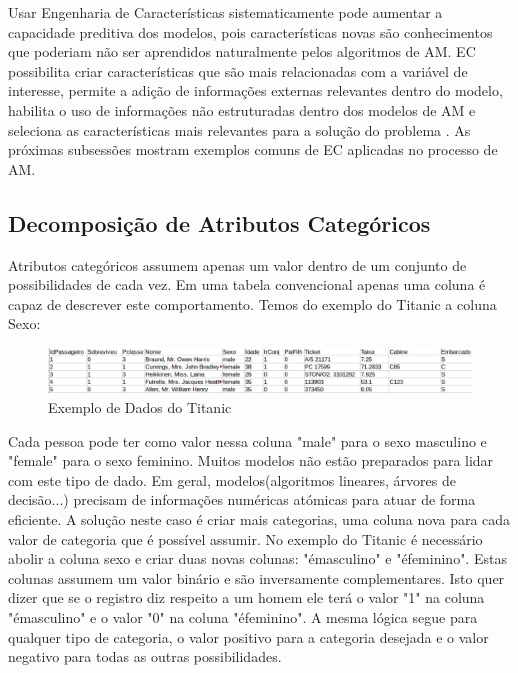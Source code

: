 Usar Engenharia de Características sistematicamente pode aumentar a capacidade preditiva dos modelos, pois características novas são conhecimentos que poderiam não ser aprendidos naturalmente pelos algoritmos de AM. EC possibilita criar características que são mais relacionadas com a variável de interesse, permite a adição de informações externas relevantes dentro do modelo, habilita o uso de informações não estruturadas dentro dos modelos de AM e seleciona as características mais relevantes para a solução do problema \cite{real2013}. As próximas subsessões mostram exemplos comuns de EC aplicadas no processo de AM.

\subsection{Decomposição de Atributos Categóricos}
Atributos categóricos assumem apenas um valor dentro de um conjunto de possibilidades de cada vez. Em uma tabela convencional apenas uma coluna é capaz de descrever este comportamento. Temos do exemplo do Titanic a coluna Sexo: 

\begin{figure}[!h]
\centering
\includegraphics[keepaspectratio=true,scale=0.40]
{figuras/dataEg.eps}
\caption{Exemplo de Dados do Titanic}
\label{data_titatic}
\end{figure}

Cada pessoa pode ter como valor nessa coluna "male" para o sexo masculino e "female" para o sexo feminino. Muitos modelos não estão preparados para lidar com este tipo de dado. Em geral, modelos(algoritmos lineares, árvores de decisão...) precisam de informações numéricas atómicas para atuar de forma eficiente. A solução neste caso é criar mais categorias, uma coluna nova para cada valor de categoria que é possível assumir. No exemplo do Titanic é necessário abolir a coluna sexo e criar duas novas colunas: "émasculino" e "éfeminino". Estas colunas assumem um valor binário e são inversamente complementares. Isto quer dizer que se o registro diz respeito a um homem ele terá o valor "1" na coluna "émasculino" e o valor "0" na coluna "éfeminino". A mesma lógica segue para qualquer tipo de categoria, o valor positivo para a categoria desejada e o valor negativo para todas as outras possibilidades.

